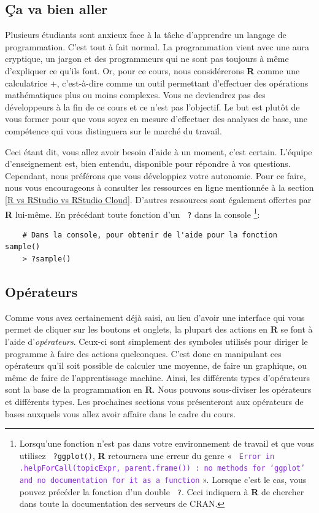 \documentclass[10.5pt,a4paper]{article}
\newcommand{\rcode}[1]{\texttt{\color{rstudio} #1}}
\begin{document}
  \subsection{Ça va bien aller}
  Plusieurs étudiants sont anxieux face à la tâche d'apprendre un langage de programmation. C'est tout à fait normal. La programmation vient avec une aura cryptique, un jargon et des programmeurs qui ne sont pas toujours à même d'expliquer ce qu'ils font. Or, pour ce cours, nous considérerons \textbf{R} comme une calculatrice +, c'est-à-dire comme un outil permettant d'effectuer des opérations mathématiques plus ou moins complexes. Vous ne deviendrez pas des développeurs à la fin de ce cours et ce n'est pas l'objectif. Le but est plutôt de vous former pour que vous soyez en mesure d'effectuer des analyses de base, une compétence qui vous distinguera sur le marché du travail.

Ceci étant dit, vous allez avoir besoin d'aide à un moment, c'est certain. L'équipe d'enseignement est, bien entendu, disponible pour répondre à vos questions. Cependant, nous préférons que vous développiez votre autonomie. Pour ce faire, nous vous encourageons à consulter les ressources en ligne mentionnée à la section \ref{R vs RStudio vs RStudio Cloud}. D'autres ressources sont également offertes par \textbf{R} lui-même. En précédant toute fonction d'un \rcode{?} dans la console \footnote{Lorsqu'une fonction n'est pas dans votre environnement de travail et que vous utilisez \rcode{?ggplot()}, \textbf{R} retournera une erreur du genre « \textcolor{BlueViolet}{\rcode{Error in .helpForCall(topicExpr, parent.frame()) : no methods for ‘ggplot’ and no documentation for it as a function}} ». Lorsque c'est le cas, vous pouvez précéder la fonction d'un double \rcode{?}. Ceci indiquera à \textbf{R} de chercher dans toute la documentation des serveurs de CRAN.}:

  \begin{lstlisting}
    # Dans la console, pour obtenir de l'aide pour la fonction sample()
    > ?sample()
  \end{lstlisting}
  
  \subsection{Opérateurs}
 Comme vous avez certainement déjà saisi, au lieu d'avoir une interface qui vous permet de cliquer sur les boutons et onglets, la plupart des actions en \textbf{R} se font à l'aide d'\emph{opérateurs}. Ceux-ci sont simplement des symboles utilisés pour diriger le programme à faire des actions quelconques. C'est donc en manipulant ces opérateurs qu'il soit possible de calculer une moyenne, de faire un graphique, ou même de faire de l'apprentissage machine. Ainsi, les différents types d'opérateurs sont la base de la programmation en \textbf{R}. Nous pouvons sous-diviser les opérateurs et différents types. Les prochaines sections vous présenteront aux opérateurs de bases auxquels vous allez avoir affaire dans le cadre du cours. 
 
\end{document}
